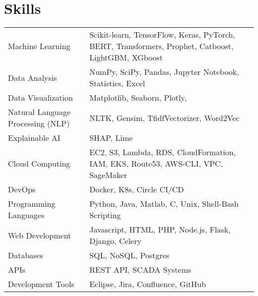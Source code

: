 \documentclass[a4paper,12pt]{article}
\begin{document}
\section{Skills}
\begin{tabularx}{\linewidth}{@{}l X@{}}
    Machine Learning & \normalsize{Scikit-learn, TensorFlow, Keras, PyTorch, BERT, Transformers, Prophet, Catboost, LightGBM, XGboost}\\
    Data Analysis & \normalsize{NumPy, SciPy, Pandas, Jupyter Notebook, Statistics, Excel}\\
    Data Visualization & \normalsize{Matplotlib, Seaborn, Plotly, }\\
    Natural Language Processing (NLP) & \normalsize{NLTK, Gensim, TfidfVectorizer, Word2Vec}\\
    Explainable AI & \normalsize{SHAP, Lime}\\
    Cloud Computing & \normalsize{EC2, S3, Lambda, RDS, CloudFormation, IAM, EKS, Route53, AWS-CLI, VPC, SageMaker}\\
    DevOps & \normalsize{Docker, K8s, Circle CI/CD}\\
    Programming Languages & \normalsize{Python, Java, Matlab, C, Unix, Shell-Bash Scripting}\\
    Web Development & \normalsize{Javascript, HTML, PHP, Node.js, Flask, Django, Celery}\\
    Databases & \normalsize{SQL, NoSQL, Postgres}\\
    APIs & \normalsize{REST API, SCADA Systems}\\
    Development Tools & \normalsize{Eclipse, Jira, Confluence, GitHub}\\
    \end{tabularx}

\vfill
\end{document}

